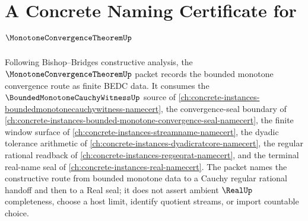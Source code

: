 \chapter{A Concrete Naming Certificate for $\MonotoneConvergenceTheoremUp$}
\label{ch:concrete-instances-monotone-convergence-theorem-namecert}

Following Bishop--Bridges constructive analysis, the $\MonotoneConvergenceTheoremUp$ packet records the bounded monotone convergence route as finite BEDC data. It consumes the $\BoundedMonotoneCauchyWitnessUp$ source of \autoref{ch:concrete-instances-boundedmonotonecauchywitness-namecert}, the convergence-seal boundary of \autoref{ch:concrete-instances-bounded-monotone-convergence-seal-namecert}, the finite window surface of \autoref{ch:concrete-instances-streamname-namecert}, the dyadic tolerance arithmetic of \autoref{ch:concrete-instances-dyadicratcore-namecert}, the regular rational readback of \autoref{ch:concrete-instances-regseqrat-namecert}, and the terminal real-name seal of \autoref{ch:concrete-instances-real-namecert}. The packet names the constructive route from bounded monotone data to a Cauchy regular rational handoff and then to a Real seal; it does not assert ambient $\RealUp$ completeness, choose a host limit, identify quotient streams, or import countable choice.

